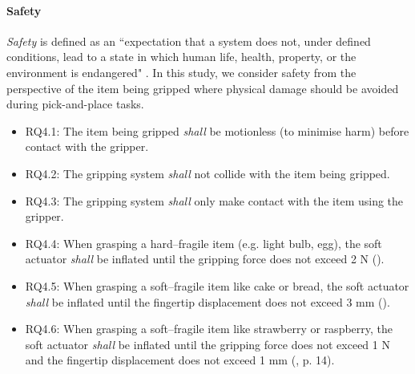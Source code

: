 \documentclass[lettersize,journal]{IEEEtran}
\begin{document}
\paragraph{Safety}\label{safety}
\emph{Safety} is defined as an ``expectation that a system does not, under defined conditions, lead to a state in which human life, health, property, or the environment is endangered" \cite{ISO24765:2017}. 
In this study, we consider safety from the perspective of the item being gripped where physical damage should be avoided during pick-and-place tasks. %
\begin{itemize}
	\item RQ4.1: The item being gripped \emph{shall} be motionless (to minimise harm) before contact with the gripper. 
	\item RQ4.2: The gripping system \emph{shall} not collide with the item being gripped. 
	\item RQ4.3: The gripping system \emph{shall} only make contact with the item using the gripper.
	\item RQ4.4: When grasping a hard–fragile item (e.g. light bulb, egg), the soft actuator \emph{shall} be inflated until the gripping force does not exceed 2 N (\cite{Cheng2021}).
	\item RQ4.5: When grasping a soft–fragile item like cake or bread, the soft actuator \emph{shall} be inflated until the fingertip displacement does not exceed 3 mm (\cite{Cheng2021}).
	\item RQ4.6: When grasping a soft–fragile item like strawberry or raspberry, the soft actuator \emph{shall} be inflated until the gripping force does not exceed 1 N and the fingertip displacement does not exceed 1 mm (\cite{Cheng2021}, p. 14).
\end{itemize}
\end{document}
